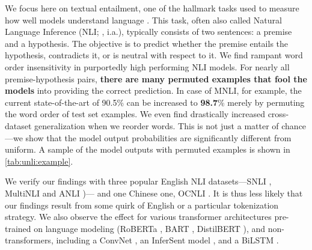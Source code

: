 \documentclass[letterpaper, 12pt]{report}
\begin{document}
We focus here on textual entailment, one of the hallmark tasks used to measure how well models understand language \citep{condoravdi-etal-2003-entailment, dagan-etal-2005-pascal}. This task, often also called Natural Language Inference (NLI; \citealt{bowman-etal-2015-large}, i.a.), typically consists of two sentences: a premise and a hypothesis. The objective is to predict whether the premise entails the hypothesis, contradicts it, or is neutral with respect to it.  We find rampant word order insensitivity in purportedly high performing NLI models. %
For nearly all premise-hypothesis pairs, \textbf{there are many permuted examples that fool the models} into providing the correct prediction. In case of MNLI, for example, the current state-of-the-art of 90.5\% can be increased to \textbf{98.7}\% merely by permuting the word order of test set examples. We even find drastically increased cross-dataset generalization when we reorder words. This is not just a matter of chance---we show that the model output probabilities are significantly different from uniform. A sample of the model outputs with permuted examples is shown in \autoref{tab:unli:example}.

We verify our findings with three popular English NLI datasets---SNLI \citep{bowman-etal-2015-large}, MultiNLI \citep{williams-etal-2018-broad} and ANLI \citep{nie-etal-2020-adversarial})---%
and one Chinese one, OCNLI \cite{hu-etal-2020-ocnli}. It is thus less likely that our findings result from some quirk of English or a particular tokenization strategy.
We also observe the effect for various transformer architectures pre-trained on language modeling (RoBERTa \citep{liu-et-al-2019-roberta}, BART \citep{lewis-etal-2020-bart}, DistilBERT \citep{sanh2020distilbert}), and non-transformers, including a ConvNet  \citep{zhao2015self}, an InferSent model \citep{conneau-etal-2017-supervised}, and a BiLSTM \citep{collobert2008unified}.
\end{document}
